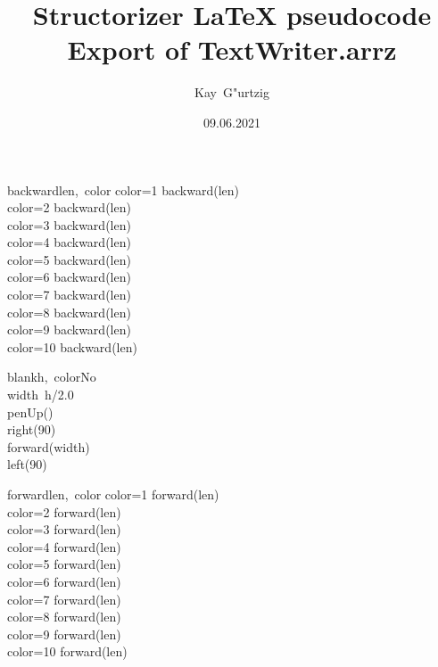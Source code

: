 \documentclass[a4paper,10pt]{article}
\title{Structorizer LaTeX pseudocode Export of TextWriter.arrz}
\author{Kay\ G"urtzig}
\date{09.06.2021}
\begin{document}
\begin{pseudocode}{backward}{len,\ color }
\label{backward}
  \IF color=1 \THEN
    backward(len)\\
  \ELSEIF color=2 \THEN
    backward(len)\\
  \ELSEIF color=3 \THEN
    backward(len)\\
  \ELSEIF color=4 \THEN
    backward(len)\\
  \ELSEIF color=5 \THEN
    backward(len)\\
  \ELSEIF color=6 \THEN
    backward(len)\\
  \ELSEIF color=7 \THEN
    backward(len)\\
  \ELSEIF color=8 \THEN
    backward(len)\\
  \ELSEIF color=9 \THEN
    backward(len)\\
  \ELSEIF color=10 \THEN
    backward(len)\\
\ENDPROCEDURE
\end{pseudocode}


\begin{pseudocode}{blank}{h,\ colorNo }
\label{blank}
\\
  width\gets\ h/2.0\\
  penUp()\\
  right(90)\\
  forward(width)\\
  left(90)\\
\ENDPROCEDURE
\end{pseudocode}


\begin{pseudocode}{forward}{len,\ color }
\label{forward}
  \IF color=1 \THEN
    forward(len)\\
  \ELSEIF color=2 \THEN
    forward(len)\\
  \ELSEIF color=3 \THEN
    forward(len)\\
  \ELSEIF color=4 \THEN
    forward(len)\\
  \ELSEIF color=5 \THEN
    forward(len)\\
  \ELSEIF color=6 \THEN
    forward(len)\\
  \ELSEIF color=7 \THEN
    forward(len)\\
  \ELSEIF color=8 \THEN
    forward(len)\\
  \ELSEIF color=9 \THEN
    forward(len)\\
  \ELSEIF color=10 \THEN
    forward(len)\\
\ENDPROCEDURE
\end{pseudocode}
\end{document}
